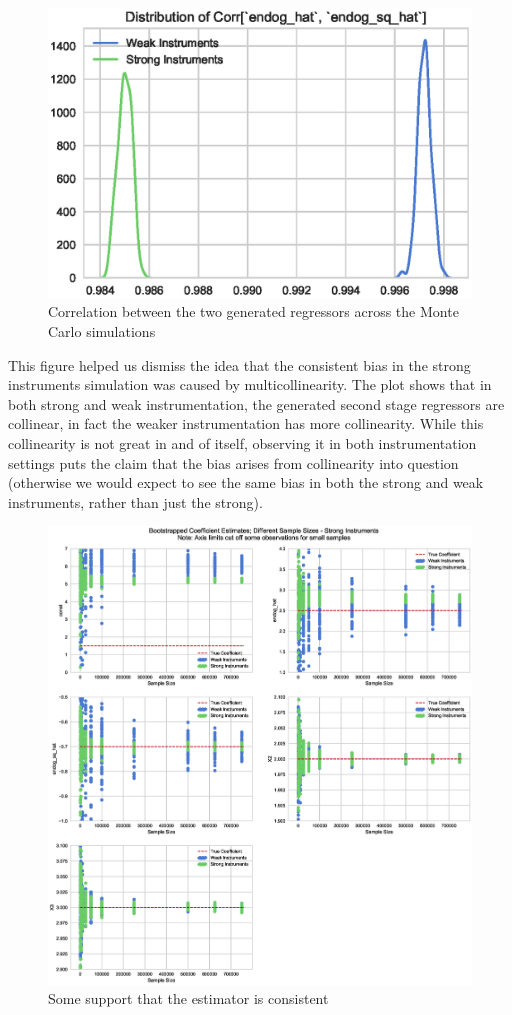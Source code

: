 \documentclass[12pt]{article}
\begin{document}
\begin{figure}[H]
\centering
\captionsetup{width=0.5\textwidth}
\includegraphics[width=0.5\linewidth,keepaspectratio]{figures/MC_strong_and_weak_corr.eps}
\caption{Correlation between the two generated regressors across the Monte Carlo simulations}
\end{figure}
This figure helped us dismiss the idea that the consistent bias in the strong instruments simulation was caused by multicollinearity. The plot shows that in both strong and weak instrumentation, the generated second stage regressors are collinear, in fact the weaker instrumentation has more collinearity. While this collinearity is not great in and of itself, observing it in both instrumentation settings puts the claim that the bias arises from collinearity into question (otherwise we would expect to see the same bias in both the strong and weak instruments, rather than just the strong).

\begin{figure}[H]
\centering
\includegraphics[width=1\linewidth,keepaspectratio]{figures/MC_strong_and_weak_sizes.eps}
\caption{Some support that the estimator is consistent}
\end{figure}
\end{document}
